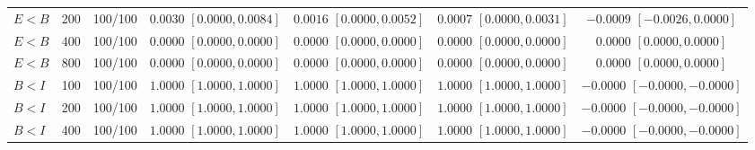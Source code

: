 \documentclass[12pt,letterpaper]{article}
\theoremstyle{plain}
\theoremstyle{definition}
\begin{document}
\begin{table}[p]
\begin{adjustbox}{max width=\linewidth}
\begin{tabular}{lrccccc}
$E<B$ & 200 & 100/100 & \shortstack{$0.0030$\\{\scriptsize$[0.0000,0.0084]$}} & \shortstack{$0.0016$\\{\scriptsize$[0.0000,0.0052]$}} & \shortstack{$0.0007$\\{\scriptsize$[0.0000,0.0031]$}} & \shortstack{$-0.0009$\\{\scriptsize$[-0.0026,0.0000]$}}\\
$E<B$ & 400 & 100/100 & \shortstack{$0.0000$\\{\scriptsize$[0.0000,0.0000]$}} & \shortstack{$0.0000$\\{\scriptsize$[0.0000,0.0000]$}} & \shortstack{$0.0000$\\{\scriptsize$[0.0000,0.0000]$}} & \shortstack{$0.0000$\\{\scriptsize$[0.0000,0.0000]$}}\\
$E<B$ & 800 & 100/100 & \shortstack{$0.0000$\\{\scriptsize$[0.0000,0.0000]$}} & \shortstack{$0.0000$\\{\scriptsize$[0.0000,0.0000]$}} & \shortstack{$0.0000$\\{\scriptsize$[0.0000,0.0000]$}} & \shortstack{$0.0000$\\{\scriptsize$[0.0000,0.0000]$}}\\
\addlinespace
$B<I$ & 100 & 100/100 & \shortstack{$1.0000$\\{\scriptsize$[1.0000,1.0000]$}} & \shortstack{$1.0000$\\{\scriptsize$[1.0000,1.0000]$}} & \shortstack{$1.0000$\\{\scriptsize$[1.0000,1.0000]$}} & \shortstack{$-0.0000$\\{\scriptsize$[-0.0000,-0.0000]$}}\\
$B<I$ & 200 & 100/100 & \shortstack{$1.0000$\\{\scriptsize$[1.0000,1.0000]$}} & \shortstack{$1.0000$\\{\scriptsize$[1.0000,1.0000]$}} & \shortstack{$1.0000$\\{\scriptsize$[1.0000,1.0000]$}} & \shortstack{$-0.0000$\\{\scriptsize$[-0.0000,-0.0000]$}}\\
$B<I$ & 400 & 100/100 & \shortstack{$1.0000$\\{\scriptsize$[1.0000,1.0000]$}} & \shortstack{$1.0000$\\{\scriptsize$[1.0000,1.0000]$}} & \shortstack{$1.0000$\\{\scriptsize$[1.0000,1.0000]$}} & \shortstack{$-0.0000$\\{\scriptsize$[-0.0000,-0.0000]$}}\\

\end{tabular}
\end{adjustbox}
\end{table}
\end{document}
